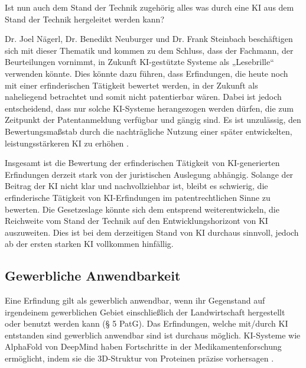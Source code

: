 Ist nun auch dem Stand der Technik zugehörig alles was durch eine KI aus dem 
Stand der Technik hergeleitet werden kann? 

Dr. Joel Nägerl, Dr. Benedikt Neuburger und Dr. Frank Steinbach beschäftigen
sich mit dieser Thematik und kommen zu dem Schluss,
dass der Fachmann, der Beurteilungen vornimmt, 
in Zukunft KI-gestützte Systeme als „Lesebrille“ verwenden könnte.
Dies könnte dazu führen, dass Erfindungen, 
die heute noch mit einer erfinderischen Tätigkeit bewertet werden, 
in der Zukunft als naheliegend betrachtet und somit nicht patentierbar wären.
Dabei ist jedoch entscheidend, 
dass nur solche KI-Systeme herangezogen werden dürfen, 
die zum Zeitpunkt der Patentanmeldung verfügbar und gängig sind. 
Es ist unzulässig, den Bewertungsmaßstab durch die nachträgliche Nutzung 
einer später entwickelten, leistungsstärkeren KI zu erhöhen 
\cite{nagerlKunstlicheIntelligenzParadigmenwechsel2019}.

Insgesamt ist die Bewertung der erfinderischen Tätigkeit
von KI-generierten Erfindungen derzeit stark von der juristischen Auslegung abhängig. 
Solange der Beitrag der KI nicht klar und nachvollziehbar ist, 
bleibt es schwierig, 
die erfinderische Tätigkeit von KI-Erfindungen 
im patentrechtlichen Sinne zu bewerten.
Die Gesetzeslage könnte sich dem entsprend weiterentwickeln, 
die Reichweite 
vom Stand der Technik auf den Entwicklungshorizont von KI auszuweiten.
Dies ist bei dem derzeitigen Stand von KI durchaus sinnvoll,
jedoch ab der ersten starken KI vollkommen hinfällig.
\\
\subsection{Gewerbliche Anwendbarkeit}
Eine Erfindung gilt als gewerblich anwendbar, 
wenn ihr Gegenstand auf irgendeinem gewerblichen
Gebiet einschließlich der Landwirtschaft hergestellt 
oder benutzt werden kann (§ 5 PatG).
Das Erfindungen, 
welche mit/durch KI entstanden sind gewerblich anwendbar sind ist durchaus möglich.
KI-Systeme wie AlphaFold von DeepMind haben Fortschritte 
in der Medikamentenforschung ermöglicht, 
indem sie die 3D-Struktur von Proteinen präzise vorhersagen \cite{AlphaFold2024}.
\\




